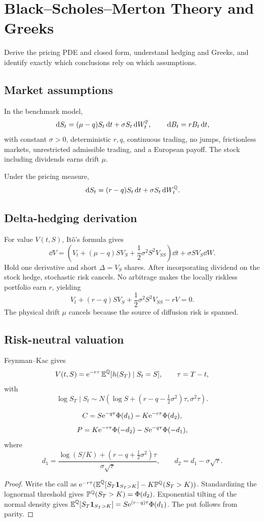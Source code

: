\chapter{Black--Scholes--Merton Theory and Greeks}

\begin{objectives}
Derive the pricing PDE and closed form, understand hedging and Greeks, and identify
exactly which conclusions rely on which assumptions.
\end{objectives}

\section{Market assumptions}

In the benchmark model,
\[
\,\mathrm d S_t=(\mu-q)S_t\,\mathrm d t+\sigma S_t\,\mathrm d W_t^\mathbb P,\qquad
\,\mathrm d B_t=rB_t\,\mathrm d t,
\]
with constant $\sigma>0$, deterministic $r,q$, continuous trading, no jumps,
frictionless markets, unrestricted admissible trading, and a European payoff. The
stock including dividends earns drift $\mu$.

Under the pricing measure,
\[
\,\mathrm d S_t=(r-q)S_t\,\mathrm d t+\sigma S_t\,\mathrm d W_t^\mathbb Q.
\]

\section{Delta-hedging derivation}

For value $V(t,S)$, Itô's formula gives
\[
\dd V=\left(V_t+(\mu-q)SV_S+\frac12\sigma^2S^2V_{SS}\right)\dd t
+\sigma SV_S\dd W.
\]
Hold one derivative and short $\Delta=V_S$ shares. After incorporating dividend on
the stock hedge, stochastic risk cancels. No arbitrage makes the locally riskless
portfolio earn $r$, yielding
\[
V_t+(r-q)SV_S+\frac12\sigma^2S^2V_{SS}-rV=0.
\]
The physical drift $\mu$ cancels because the source of diffusion risk is spanned.

\section{Risk-neutral valuation}

Feynman--Kac gives
\[
V(t,S)=\mathrm e^{-r\tau}\operatorname{\mathbb E}^\mathbb Q[h(S_T)\mid S_t=S],
\qquad \tau=T-t,
\]
with
\[
\log S_T\mid S_t
\sim N\left(\log S+(r-q-\tfrac12\sigma^2)\tau,\sigma^2\tau\right).
\]

\begin{theorem}
\[
C=S\mathrm e^{-q\tau}\Phi(d_1)-K\mathrm e^{-r\tau}\Phi(d_2),
\]
\[
P=K\mathrm e^{-r\tau}\Phi(-d_2)-S\mathrm e^{-q\tau}\Phi(-d_1),
\]
where
\[
d_1=\frac{\log(S/K)+(r-q+\frac12\sigma^2)\tau}
{\sigma\sqrt\tau},\qquad
d_2=d_1-\sigma\sqrt\tau.
\]
\end{theorem}
\begin{proof}
Write the call as
$\mathrm e^{-r\tau}(\operatorname{\mathbb E}^\mathbb Q[S_T\mathbf 1_{S_T>K}]
-K\mathbb P^\mathbb Q(S_T>K))$. Standardizing the lognormal threshold gives
$\mathbb P^\mathbb Q(S_T>K)=\Phi(d_2)$. Exponential tilting of the normal density gives
$\operatorname{\mathbb E}^\mathbb Q[S_T\mathbf 1_{S_T>K}]=S\mathrm e^{(r-q)\tau}\Phi(d_1)$. The put follows from parity.
\end{proof}

